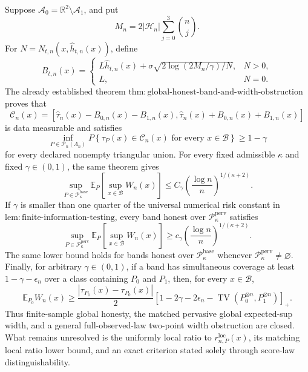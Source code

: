 Suppose \(\mathcal A_0=\mathbb R^2\setminus\mathcal A_1\), and put
\[
 M_n=2|\mathcal H_n|\sum_{j=0}^3\binom nj.
\]
For \(N=N_{t,n}(x,\widehat h_{t,n}(x))\), define
\[
 B_{t,n}(x)=
 \begin{cases}
 L\widehat h_{t,n}(x)+\sigma\sqrt{2\log(2M_n/\gamma)/N},&N>0,\\
 L,&N=0.
 \end{cases}
\]
The already established theorem \(\mathrm{thm:global\text{-}honest\text{-}band\text{-}and\text{-}width\text{-}obstruction}\) proves that
\[
 \mathcal C_n(x)=
 \left[\widehat\tau_n(x)-B_{0,n}(x)-B_{1,n}(x),
 \widehat\tau_n(x)+B_{0,n}(x)+B_{1,n}(x)\right]
\]
is data measurable and satisfies
\[
 \inf_{P\in\mathcal P_n(\Lambda_n)}
 P\!\left\{\tau_P(x)\in\mathcal C_n(x)
 \text{ for every }x\in\mathcal B\right\}\ge 1-\gamma
\]
for every declared nonempty triangular union.  For every fixed admissible \(\kappa\) and fixed \(\gamma\in(0,1)\), the same theorem gives
\[
 \sup_{P\in\mathcal P_{\kappa}^{\mathrm{base}}}
 \mathbb E_P\!\left[\sup_{x\in\mathcal B}W_n(x)\right]
 \le C_\gamma\left(\frac{\log n}{n}\right)^{1/(\kappa+2)}.
\]
If \(\gamma\) is smaller than one quarter of the universal numerical risk constant in \(\mathrm{lem:finite\text{-}information\text{-}testing}\), every band honest over \(\mathcal P_{\kappa}^{\mathrm{perv}}\) satisfies
\[
 \sup_{P\in\mathcal P_{\kappa}^{\mathrm{perv}}}
 \mathbb E_P\!\left[\sup_{x\in\mathcal B}W_n(x)\right]
 \ge c_\gamma\left(\frac{\log n}{n}\right)^{1/(\kappa+2)}.
\]
The same lower bound holds for bands honest over \(\mathcal P_{\kappa}^{\mathrm{base}}\) whenever \(\mathcal P_{\kappa}^{\mathrm{perv}}\ne\varnothing\).  Finally, for arbitrary \(\gamma\in(0,1)\), if a band has simultaneous coverage at least \(1-\gamma-\epsilon_n\) over a class containing \(P_0\) and \(P_1\), then, for every \(x\in\mathcal B\),
\[
 \mathbb E_{P_0}W_n(x)\ge
 \frac{|\tau_{P_1}(x)-\tau_{P_0}(x)|}{2}
 \left[1-2\gamma-2\epsilon_n-
 \operatorname{TV}(P_0^{\otimes n},P_1^{\otimes n})\right]_+.
\]
Thus finite-sample global honesty, the matched pervasive global expected-sup width, and a general full-observed-law two-point width obstruction are closed.  What remains unresolved is the uniformly local ratio to \(r_{n,P}^{\mathrm{loc}}(x)\), its matching local ratio lower bound, and an exact criterion stated solely through score-law distinguishability.